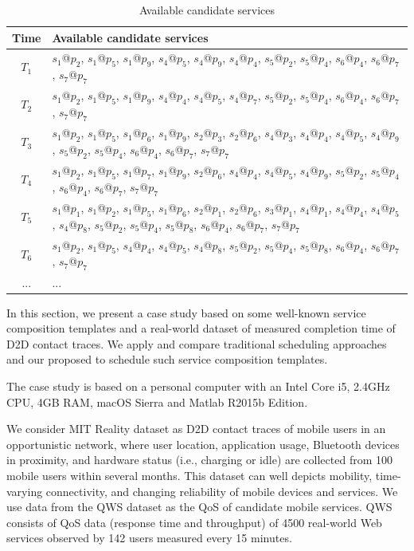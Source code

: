 \documentclass[journal]{IEEEtran}
\begin{document}
\begin{table}[!t]
\renewcommand{\arraystretch}{1.5}
\caption{Available candidate services}
\label{Available candidate services}
\centering
\begin{tabular}{c l}
\hline
\bfseries Time & \bfseries Available candidate services\\
\hline
$T_1$     & $s_1$@$p_2$, $s_1$@$p_5$, $s_1$@$p_9$, $s_4$@$p_5$, $s_4$@$p_9$, $s_4$@$p_4$, $s_5$@$p_2$, $s_5$@$p_4$, $s_6$@$p_4$, $s_6$@$p_7$, $s_7$@$p_7$ \\
$T_2$     & $s_1$@$p_2$, $s_1$@$p_5$, $s_1$@$p_9$, $s_4$@$p_4$, $s_4$@$p_5$, $s_4$@$p_7$, $s_5$@$p_2$, $s_5$@$p_4$, $s_6$@$p_4$, $s_6$@$p_7$, $s_7$@$p_7$ \\
$T_3$     & $s_1$@$p_2$, $s_1$@$p_5$, $s_1$@$p_6$, $s_1$@$p_9$, $s_2$@$p_3$, $s_2$@$p_6$, $s_4$@$p_3$, $s_4$@$p_4$, $s_4$@$p_5$, $s_4$@$p_9$, $s_5$@$p_2$, $s_5$@$p_4$, $s_6$@$p_4$, $s_6$@$p_7$, $s_7$@$p_7$ \\
$T_4$     & $s_1$@$p_2$, $s_1$@$p_5$, $s_1$@$p_7$, $s_1$@$p_9$, $s_2$@$p_6$, $s_4$@$p_4$, $s_4$@$p_5$, $s_4$@$p_9$, $s_5$@$p_2$, $s_5$@$p_4$, $s_6$@$p_4$, $s_6$@$p_7$, $s_7$@$p_7$ \\
$T_5$     & $s_1$@$p_1$, $s_1$@$p_2$, $s_1$@$p_5$, $s_1$@$p_6$, $s_2$@$p_1$, $s_2$@$p_6$, $s_3$@$p_1$, $s_4$@$p_1$, $s_4$@$p_4$, $s_4$@$p_5$, $s_4$@$p_8$, $s_5$@$p_2$, $s_5$@$p_4$, $s_5$@$p_8$, $s_6$@$p_4$, $s_6$@$p_7$, $s_7$@$p_7$ \\
$T_6$     & $s_1$@$p_2$, $s_1$@$p_5$, $s_4$@$p_4$, $s_4$@$p_5$, $s_4$@$p_8$, $s_5$@$p_2$, $s_5$@$p_4$, $s_5$@$p_8$, $s_6$@$p_4$, $s_6$@$p_7$, $s_7$@$p_7$ \\
... & ...\\
\hline
\end{tabular}
\end{table}


In this section, we present a case study based on some well-known service composition templates and a real-world dataset of measured completion time of D2D contact traces. We apply and compare traditional scheduling approaches and our proposed to schedule such service composition templates.

The case study is based on a personal computer with an Intel Core i5, 2.4GHz CPU, 4GB RAM, macOS Sierra and Matlab R2015b Edition.

We consider MIT Reality dataset \cite{eagle2006reality} as D2D contact traces of mobile users in an opportunistic network, where user location, application usage, Bluetooth devices in proximity, and hardware status (i.e., charging or idle) are collected from 100 mobile users within several months. This dataset can well depicts mobility, time-varying connectivity, and changing reliability of mobile devices and services. 
We use data from the QWS dataset \cite{zheng2014investigating} as the QoS of candidate mobile services. 
QWS consists of QoS data (response time and throughput) of 4500 real-world Web services observed by 142 users measured every 15 minutes.
\end{document}
